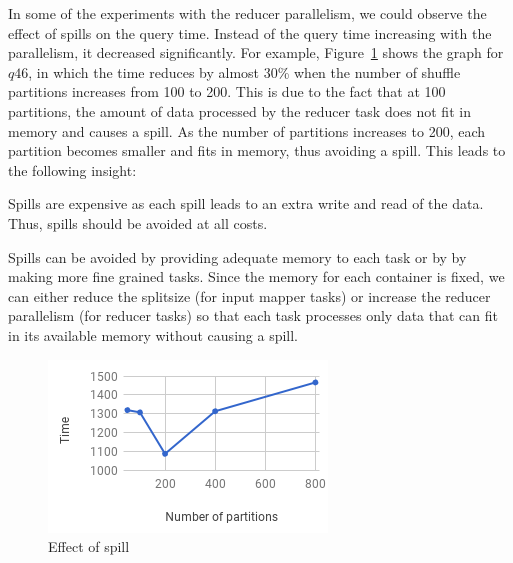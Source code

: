 In some of the experiments with the reducer parallelism, we could observe the effect of spills on the query time. Instead of the query time increasing with the parallelism, it decreased significantly. For example, Figure~\ref{fig:q46} shows the graph for $q46$, in which the time reduces by almost 30\% when the number of shuffle partitions increases from 100 to 200. This is due to the fact that at 100 partitions, the amount of data processed by the reducer task does not fit in memory and causes a spill. As the number of partitions increases to 200, each partition becomes smaller and fits in memory, thus avoiding a spill. This leads to the following insight:
\begin{insight}
	Spills are expensive as each spill leads to an extra write and read of the data. Thus, spills should be avoided at all costs.
\end{insight}
Spills can be avoided by providing adequate memory to each task or by by making more fine grained tasks. Since the memory for each container is fixed, we can either reduce the splitsize (for input mapper tasks) or increase the reducer parallelism (for reducer tasks) so that each task processes only data that can fit in its available memory without causing a spill.

\begin{figure}[h]
	\includegraphics[width=\linewidth]{fig/q46.png}
	\caption{Effect of spill}
	\label{fig:q46}
\end{figure}


